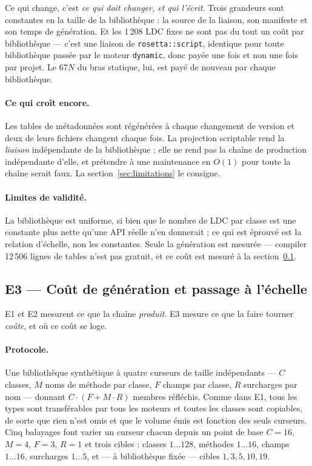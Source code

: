 \documentclass[11pt,a4paper]{article}
\newcommand{\code}[1]{\texttt{\small #1}}
\begin{document}
Ce qui change, c'est \emph{ce qui doit changer, et qui l'écrit}. Trois grandeurs
sont constantes en la taille de la bibliothèque : la source de la liaison, son
manifeste et son temps de génération. Et les 1\,208 LDC fixes ne sont pas du tout
un coût par bibliothèque --- c'est une liaison de \code{rosetta::script},
identique pour toute bibliothèque passée par le moteur \code{dynamic}, donc payée
une fois et non une fois par projet. Le $67N$ du bras statique, lui, est payé de
nouveau par chaque bibliothèque.

\paragraph{Ce qui croît encore.} Les tables de métadonnées sont régénérées à
chaque changement de version et deux de leurs fichiers changent chaque fois. La
projection scriptable rend la \emph{liaison} indépendante de la bibliothèque ;
elle ne rend pas la chaîne de production indépendante d'elle, et prétendre à une
maintenance en $O(1)$ pour toute la chaîne serait faux. La
section~\ref{sec:limitations} le consigne.

\paragraph{Limites de validité.} La bibliothèque est uniforme, si bien que le
nombre de LDC par classe est une constante plus nette qu'une API réelle n'en
donnerait ; ce qui est éprouvé est la relation d'échelle, non les constantes.
Seule la génération est mesurée --- compiler 12\,506 lignes de tables n'est pas
gratuit, et ce coût est mesuré à la section~\ref{sec:e3}.

\subsection{E3 --- Coût de génération et passage à l'échelle}
\label{sec:e3}

E1 et E2 mesurent ce que la chaîne \emph{produit}. E3 mesure ce que la faire
tourner \emph{coûte}, et où ce coût se loge.

\paragraph{Protocole.} Une bibliothèque synthétique à quatre curseurs de taille
indépendants --- $C$ classes, $M$ noms de méthode par classe, $F$ champs par
classe, $R$ surcharges par nom --- donnant $C\cdot(F + M\cdot R)$ membres
réfléchis. Comme dans E1, tous les types sont transférables par tous les moteurs
et toutes les classes sont copiables, de sorte que rien n'est omis et que le
volume émis est fonction des seuls curseurs. Cinq balayages font varier un
curseur chacun depuis un point de base $C=16$, $M=4$, $F=3$, $R=1$ et trois
cibles : classes $1\dots128$, méthodes $1\dots16$, champs $1\dots16$, surcharges
$1\dots5$, et --- à bibliothèque fixée --- cibles $1, 3, 5, 10, 19$.
\end{document}
